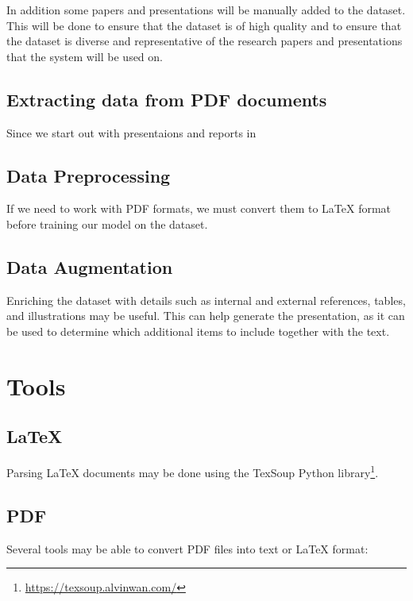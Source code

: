 In addition some papers and presentations will be manually added to the dataset. This will be done to ensure that the dataset is of high quality and to ensure that the dataset is diverse and representative of the research papers and presentations that the system will be used on.

\subsection{Extracting data from PDF documents}
Since we start out with presentaions and reports in 

\subsection{Data Preprocessing}
If we need to work with PDF formats, we must convert them to \LaTeX{} format before training our model on the dataset. 

\subsection{Data Augmentation}
Enriching the dataset with details such as internal and external references, tables, and illustrations may be useful. This can help generate the presentation, as it can be used to determine which additional items to include together with the text.

\section{Tools}

\subsection{\LaTeX{}}
Parsing \LaTeX{} documents may be done using the TexSoup Python library\footnote{\url{https://texsoup.alvinwan.com/}}.

\subsection{PDF}
Several tools may be able to convert PDF files into text or \LaTeX{} format: 

